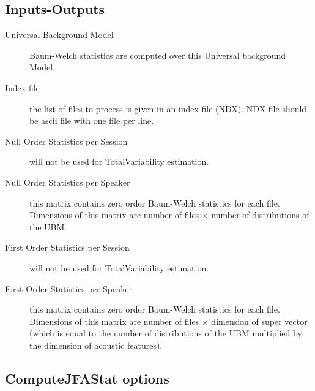 \subsection{Inputs-Outputs}
%
\begin{description}
\item[Universal Background Model] Baum-Welch statistics are computed over this Universal background Model.
%
\item[Index file] the list of files to process is given in an index file (NDX). NDX file should be ascii file with one file per line.
%
\item[Null Order Statistics per Session] will not be used for TotalVariability estimation.
%
\item[Null Order Statistics per Speaker] this matrix contains zero order Baum-Welch statistics for each file. Dimensions of this matrix are number of files $\times$ number of distributions of the UBM.
%
\item[First Order Statistics per Session] will not be used for TotalVariability estimation.
%
\item[First Order Statistics per Speaker] this matrix contains zero order Baum-Welch statistics for each file. Dimensions of this matrix are number of files $\times$ dimension of super vector (which is equal to the number of distributions of the UBM multiplied by the dimension of acoustic features).
\end{description}

\newpage
\subsection{ComputeJFAStat options}

